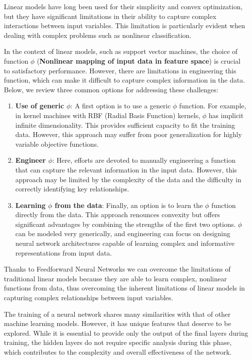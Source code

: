 Linear models have long been used for their simplicity and convex optimization, but they have significant limitations in their ability to capture complex interactions between input variables. This limitation is particularly evident when dealing with complex problems such as nonlinear classification.

In the context of linear models, such as support vector machines, the choice of function \( \phi \) (\textbf{Nonlinear mapping of input data in feature space}) is crucial to satisfactory performance. However, there are limitations in engineering this function, which can make it difficult to capture complex information in the data. Below, we review three common options for addressing these challenges:
\begin{enumerate}
    \item \textbf{Use of generic \( \phi \)}: A first option is to use a generic \( \phi \) function. For example, in kernel machines with RBF (Radial Basis Function) kernels, \( \phi \) has implicit infinite dimensionality. This provides sufficient capacity to fit the training data. However, this approach may suffer from poor generalization for highly variable objective functions.
    \item \textbf{Engineer \( \phi \)}: Here, efforts are devoted to manually engineering a function that can capture the relevant information in the input data. However, this approach may be limited by the complexity of the data and the difficulty in correctly identifying key relationships.
    \item \textbf{Learning \( \phi \) from the data}: Finally, an option is to learn the \( \phi \) function directly from the data. This approach renounces convexity but offers significant advantages by combining the strengths of the first two options. \( \phi \) can be modeled very generically, and engineering can focus on designing neural network architectures capable of learning complex and informative representations from input data.
\end{enumerate}

Thanks to Feedforward Neural Networks we can overcome the limitations of traditional linear models because they are able to learn complex, nonlinear functions from data, thus overcoming the inherent limitations of linear models in capturing complex relationships between input variables.

The training of a neural network shares many similarities with that of other machine learning models. However, it has unique features that deserve to be explored. While it is essential to provide only the output of the final layers during training, the hidden layers do not require specific analysis during this phase, which contributes to the complexity and overall effectiveness of the network.

